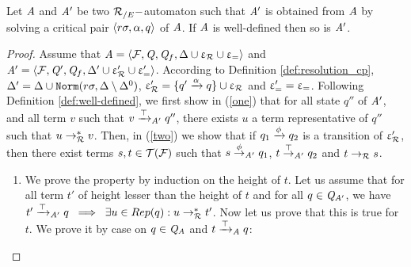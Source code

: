 \begin{lemma}
\label{lemma:C-well-defined}
  Let $\mathit A$ and $\mathit A'$ be two ${\mathcal R_{/E}}-$automaton such that 
  $\mathit A'$ is obtained from $\mathit A$ by solving 
  a critical pair $\langle r\sigma,\alpha,q \rangle$ of $\mathit A$. 
  If $\mathit A$ is well-defined then so is $\mathit A'$. 
\end{lemma}
\begin{proof}
  Assume that $\mathit A=\langle \mathcal{F}, \mathit Q, \mathit Q_f, \Delta\cup \upvarepsilon_{\mathcal R}\cup \upvarepsilon_{=}\rangle$ and
  $\mathit A'=\langle \mathcal{F}, \mathit Q', \mathit Q_f, \Delta'\cup \upvarepsilon_{\mathcal R}'\cup \upvarepsilon_{=}' \rangle$.  According
  to Definition \ref{def:resolution_cp}, $\Delta'=\Delta \cup
  \mathtt{Norm}(r\sigma, \Delta\setminus \Delta^0)$, $\upvarepsilon_{\mathcal R}'= \{
  q'\xrightarrow{\alpha} q\}\cup \upvarepsilon_{\mathcal R}$ and $\upvarepsilon_{=}'=\upvarepsilon_{=}$.
  Following Definition \ref{def:well-defined}, we first show in (\ref{one}) that 
  for all state $q''$ of $\mathit A'$, and all term $v$ such that
  $v \xrightarrow{\top}_{\mathit A'} q''$, there exists $u$ a term representative
  of $q''$ such that $u \rightarrow^*_\mathcal R v$. Then, in (\ref{two}) we show that
  if $q_1 \xrightarrow{\phi} q_2$ is a transition of $\upvarepsilon_{\mathcal R}'$, then there exist terms
    $s,t\in \mathcal{T(F)}$ such that $s\stackrel{\phi}{\rightarrow}_{\mathit A'} q_1$, $t\stackrel{\top}{\rightarrow}_{\mathit A'} q_2$
    and $t \rightarrow_\mathcal R s$.

\medskip
  
\begin{enumerate}
\item \label{one} 



\newcommand{\xrwa}{\xrw{\top}_\A}
\newcommand{\xrwap}{\xrw{\top}_{\A'}}

We prove the property by induction on the height of $t$. Let us assume that for all term $t'$ of height
lesser than the height of $t$ and for all $q\in \mathit Q_{\mathit A'}$, we have $t' \xrwap q
\spf \exists u\in Rep(q): u \rwR^* t'$. Now let us prove that this is true for
$t$. We prove it by case on $q\in\mathit Q_\mathit A$ and $t\xrwa q$:


\end{enumerate}
\end{proof}
